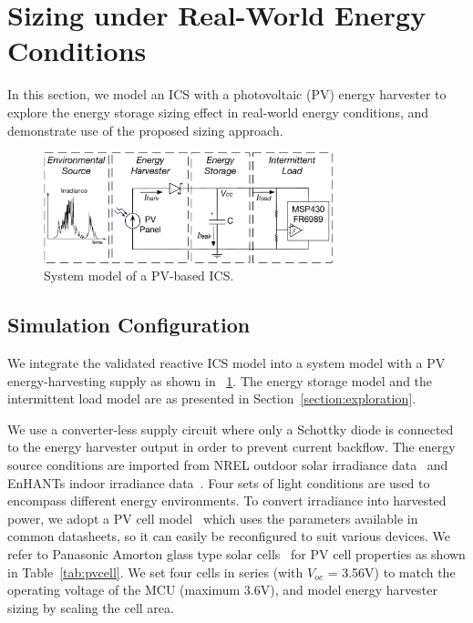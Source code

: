
\section{Sizing under Real-World Energy Conditions} \label{section:demo}

In this section, we model an ICS with a photovoltaic (PV) energy harvester to explore the energy storage sizing effect in real-world energy conditions, and demonstrate use of the proposed sizing approach. 

\begin{figure}[!t]
    \centering
    \includegraphics[width=3.3in]{ch4_sizingapproach/figures/solarmodel4}
    \caption{System model of a PV-based ICS.}
    \label{fig:Model}
\end{figure}

\subsection{Simulation Configuration}

We integrate the validated reactive ICS model into a system model with a PV energy-harvesting supply as shown in \figurename{~\ref{fig:Model}}. 
The energy storage model and the intermittent load model are as presented in Section~\ref{section:exploration}. 

We use a converter-less supply circuit where only a Schottky diode is connected to the energy harvester output in order to prevent current backflow. 
The energy source conditions are imported from NREL outdoor solar irradiance data~\cite{stoffel1981nrel} and EnHANTs indoor irradiance data~\cite{6244798}. Four sets of light conditions are used to encompass different energy environments. 
To convert irradiance into harvested power, we adopt a PV cell model~\cite{en9050326} which uses the parameters available in common datasheets, so it can easily be reconfigured to suit various devices. 
We refer to Panasonic Amorton glass type solar cells~\cite{solarcell} for PV cell properties as shown in Table~\ref{tab:pvcell}. We set four cells in series (with $V_{oc}$ = 3.56V) to match the operating voltage of the MCU (maximum 3.6V), and model energy harvester sizing by scaling the cell area. 

